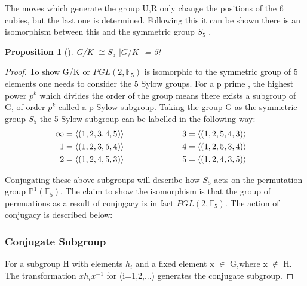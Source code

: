 \documentclass{article}
\newtheorem{proposition}[section]{Proposition}
\begin{document}
The moves which generate the group U,R only change the positions of the 6 cubies, but the last one is determined. Following this it can be shown there is an isomorphism between this and the symmetric group $S_5$ \cite{bandelow2012inside}.

\begin{proposition}[]
G/K $\cong S_5$ $|G/K|$ = 5!
\end{proposition}
\begin{proof}
To show G/K or $PGL(2,\mathbb{F}_5)$ is isomorphic to the symmetric group of 5 elements one needs to consider the 5 Sylow groups. For a p prime , the highest power $p^{k}$ which divides the order of the group means there exists a subgroup of G, of order $p^{k}$ called a p-Sylow subgroup. Taking the group G as the symmetric group $S_5$ the 5-Sylow subgroup can be labelled in the following way: 
\begin{alignat*}{2}
& \begin{aligned}
\infty &= \langle (1,2,3,4,5) \rangle\\
1 &= \langle (1,2,3,5,4) \rangle \\
2 &= \langle (1,2,4,5,3) \rangle \\
\end{aligned} 
& \hskip 6em &
\begin{aligned}
3 &= \langle (1,2,5,4,3) \rangle \\
4 &= \langle (1,2,5,3,4) \rangle \\
5 &= \langle (1,2,4,3,5) \rangle
\end{aligned}
\end{alignat*}

Conjugating these above subgroups will describe how $S_5$ acts on the permutation group $\mathbb{P}^{1}(\mathbb{F}_5)$. The claim to show the isomorphism is that the group of permuations as a result of conjugacy is in fact $PGL(2,\mathbb{F}_5)$. The action of conjugacy is described below:

\subsubsection{Conjugate Subgroup}
For a subgroup H with elements $h_{i}$ and a fixed element x $\in$ G,where x $\not\in$ H. The transformation $xh_{i}x^{-1}$ for (i=1,2,...) generates the conjugate subgroup. 

\end{proof}
\end{document}
